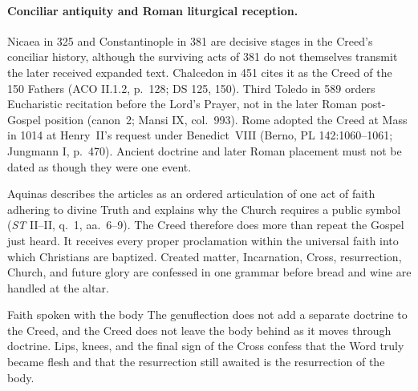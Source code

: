 \paragraph{Conciliar antiquity and Roman liturgical reception.}
Nicaea in 325 and Constantinople in 381 are decisive stages in the Creed's conciliar history, although the surviving acts of 381 do not themselves transmit the later received expanded text. Chalcedon in 451 cites it as the Creed of the 150 Fathers (ACO II.1.2, p.~128; DS 125, 150). Third Toledo in 589 orders Eucharistic recitation before the Lord's Prayer, not in the later Roman post-Gospel position (canon~2; Mansi IX, col.~993). Rome adopted the Creed at Mass in 1014 at Henry~II's request under Benedict~VIII (Berno, PL 142:1060--1061; Jungmann I, p.~470). Ancient doctrine and later Roman placement must not be dated as though they were one event.

Aquinas describes the articles as an ordered articulation of one act of faith adhering to divine Truth and explains why the Church requires a public symbol (\emph{ST} II--II, q.~1, aa.~6--9). The Creed therefore does more than repeat the Gospel just heard. It receives every proper proclamation within the universal faith into which Christians are baptized. Created matter, Incarnation, Cross, resurrection, Church, and future glory are confessed in one grammar before bread and wine are handled at the altar.

\begin{studybox}{Faith spoken with the body}
The genuflection does not add a separate doctrine to the Creed, and the Creed does not leave the body behind as it moves through doctrine. Lips, knees, and the final sign of the Cross confess that the Word truly became flesh and that the resurrection still awaited is the resurrection of the body.
\end{studybox}
